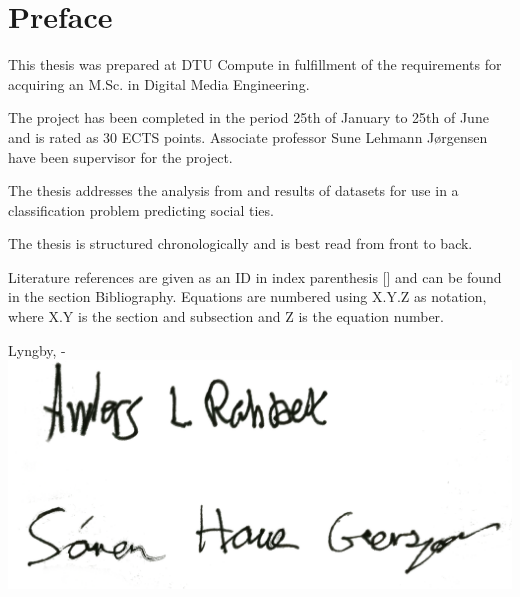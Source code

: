 \chapter{Preface}
This thesis was prepared at DTU Compute in fulfillment of the requirements for acquiring an M.Sc. in Digital Media Engineering.

The project has been completed in the period 25th of January to 25th of June and is rated as 30 ECTS points. Associate professor Sune Lehmann Jørgensen have been supervisor for the project.

The thesis addresses the analysis from and results of datasets for use in a classification problem predicting social ties.

The thesis is structured chronologically and is best read from front to back.

Literature references are given as an ID in index parenthesis [] and can be found in the section Bibliography.
Equations are numbered using X.Y.Z as notation, where X.Y is the section and subsection and Z is the equation number.

\vspace{12mm}
\begin{center}
    \hspace{20mm} Lyngby, \thesishandin-\thesisyear
    \vspace{2mm}
    \newline
    \includegraphics[scale=0.05]{figures/signature}
\end{center}
\begin{flushright}
    \thesisauthor
\end{flushright}
